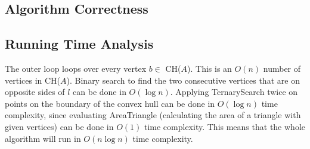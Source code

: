 \documentclass[a4paper]{article}
\begin{document}
    \subsection*{Algorithm Correctness}


    \subsection*{Running Time Analysis}
    The outer loop loops over every vertex $b \in$ CH($A$).
    This is an $O(n)$ number of vertices in CH($A$). 
    Binary search to find the two consecutive vertices that are on opposite sides of $l$ can be done in $O(\log n)$.
    Applying TernarySearch twice on points on the boundary of the convex hull can be done in $O(\log n)$ time complexity, since evaluating AreaTriangle (calculating the area of a triangle with given vertices) can be done in  $O(1)$ time complexity.
    This means that the whole algorithm will run in $O(n\log n)$ time complexity.
\end{document}
